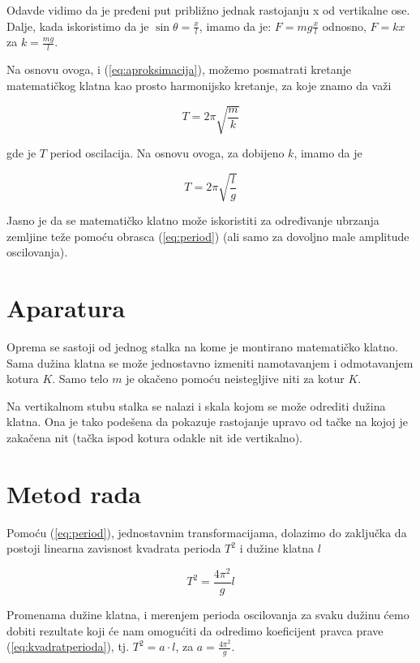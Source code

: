 \documentclass[a4paper]{article}
\begin{document}
Odavde vidimo da je pređeni put približno jednak rastojanju x od vertikalne ose. Dalje, kada iskoristimo da je $\sin\theta = \frac{x}{l}$, imamo da je: $F = mg \tfrac{x}{l}$ odnosno, $F = kx$ za $k = \tfrac{mg}{l}$.

Na osnovu ovoga, i (\ref{eq:aproksimacija}), možemo posmatrati kretanje matematičkog klatna kao prosto harmonijsko kretanje, za koje znamo da važi

\begin{equation}
    T = 2 \pi \sqrt{\frac{m}{k}}
\end{equation}

gde je $T$ period oscilacija. Na osnovu ovoga, za dobijeno $k$, imamo da je

\begin{equation}
    \label{eq:period}
    T = 2 \pi \sqrt{\frac{l}{g}}
\end{equation}

Jasno je da se matematičko klatno može iskoristiti za određivanje ubrzanja zemljine teže pomoću obrasca (\ref{eq:period}) (ali samo za dovoljno male amplitude oscilovanja).

\section{Aparatura}

Oprema se sastoji od jednog stalka na kome je montirano matematičko klatno. Sama dužina klatna se može jednostavno izmeniti namotavanjem i odmotavanjem kotura $K$. Samo telo $m$ je okačeno pomoću neistegljive niti za kotur $K$.

Na vertikalnom stubu stalka se nalazi i skala kojom se može odrediti dužina klatna. Ona je tako podešena da pokazuje rastojanje upravo od tačke na kojoj je zakačena nit (tačka ispod kotura odakle nit ide vertikalno).

\section{Metod rada}

Pomoću (\ref{eq:period}), jednostavnim transformacijama, dolazimo do zaključka da postoji linearna zavisnost kvadrata perioda $T^2$ i dužine klatna $l$

\begin{equation}
    \label{eq:kvadratperioda}
    T^2 = \frac{4 \pi^2}{g} l
\end{equation}

Promenama dužine klatna, i merenjem perioda oscilovanja za svaku dužinu ćemo dobiti rezultate koji će nam omogućiti da odredimo koeficijent pravca prave (\ref{eq:kvadratperioda}), tj.
$T^2 = a \cdot l$, za $a = \frac{4 \pi^2}{g}$.
\end{document}
